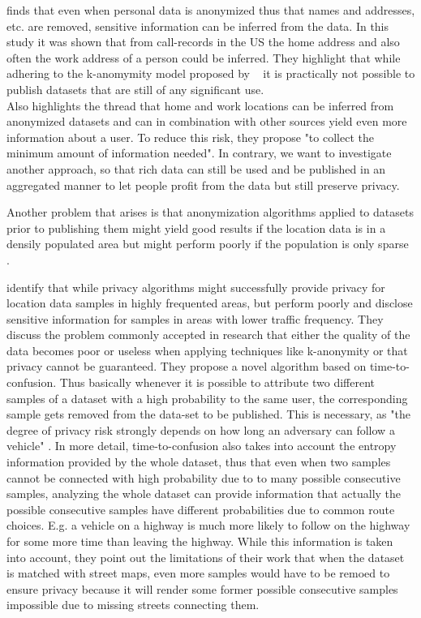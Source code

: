 \parencite{cellphone} finds that even when personal data is anonymized thus that names and addresses, etc. are removed, sensitive information can be inferred from the data.
In this study it was shown that from call-records in the US the home address and also often the work address of a person could be inferred.
They highlight that while adhering to the k-anomymity model proposed by ~\parencite{k-anonymity} it is practically not possible to publish datasets that are still of any significant use.
\\

Also \parencite{privacy-home-work-pairs} highlights the thread that home and work locations can be inferred from anonymized datasets and can in combination with other sources yield even more information about a user. To reduce this risk, they propose "to collect the minimum amount of information needed". In contrary, we want to investigate another approach, so that rich data can still be used and be published in an aggregated manner to let people profit from the data but still preserve privacy.


Another problem that arises is that anonymization algorithms applied to datasets prior to publishing them might yield good results if the location data is in a densily populated area but might perform poorly if the population is only sparse \parencite{time-to-confusion}.

\parencite{time-to-confusion} identify that while privacy algorithms might successfully provide privacy for location data samples in highly frequented areas, but perform poorly and disclose sensitive information for samples in areas with lower traffic frequency. They discuss the problem commonly accepted in research that either the quality of the data becomes poor or useless when applying techniques like k-anonymity \parencite{k-anonymity-old, k-anonymity, k-anonymity-achieving} or that privacy cannot be guaranteed. They propose a novel algorithm based on time-to-confusion. Thus basically whenever it is possible to attribute two different samples of a dataset with a high probability to the same user, the corresponding sample gets removed from the data-set to be published. This is necessary, as "the degree of privacy risk strongly depends on how long an adversary can follow a vehicle" \parencite{time-to-confusion}. In more detail, time-to-confusion also takes into account the entropy information provided by the whole dataset, thus that even when two samples cannot be connected with high probability due to to many possible consecutive samples, analyzing the whole dataset can provide information that actually the possible consecutive samples have different probabilities due to common route choices. E.g. a vehicle on a highway is much more likely to follow on the highway for some more time than leaving the highway. While this information is taken into account, they point out the limitations of their work that when the dataset is matched with street maps, even more samples would have to be remoed to ensure privacy because it will render some former possible consecutive samples impossible due to missing streets connecting them. 

